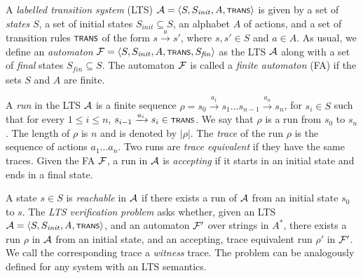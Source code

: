 \begin{definition}
	A \emph{labelled transition system} (LTS) \cite{heussner2012reachability}  $\cal A = \tup{S,S_{\mathit{init}},A,\trans}$ is given by a set of \emph{states} $S$, a set of initial states $S_{\mathit{init}}\subseteq S$, an alphabet $A$ of actions, and a set of transition rules $\scrsf{trans}$ of the form $s \xrightarrow{a} s'$, where $s,s'\in S$ and $a \in A$. As usual, we define an \emph{automaton} $\cal F = \tup{S, S_{\mathit{init}}, A, \trans, S_{\mathit{fin}}}$ as the LTS $\cal A$ along with a set of \emph{final} states $S_{\mathit{fin}} \subseteq S$. The automaton $\cal F$ is called a \emph{finite automaton} (FA) if the sets $S$ and $A$ are finite.
\end{definition}

A \emph{run} in the LTS $\cal A$ is a finite sequence $\rho = s_0 \xrightarrow{a_1} s_1 \ldots s_{n-1} \xrightarrow{a_n} s_n$, for $s_i \in S$ such that for every $1 \leq i \leq n$, $s_{i-1} \xrightarrow{a_i} s_i \in \trans$. We say that $\rho$ is a run from $s_0$ to $s_n$. The length of $\rho$ is $n$ and is denoted by $|\rho|$. The \emph{trace} of the run $\rho$ is the sequence of actions $a_1\ldots a_n$. Two runs are \emph{trace equivalent} if they have the same traces. Given the FA $\cal F$, a run in $\cal A$ is \emph{accepting} if it starts in an initial state and ends in a final state.

A state $s \in S$ is \emph{reachable} in $\cal A$ if there exists a run of $\cal A$ from an initial state $s_0$ to $s$.  The \emph{LTS verification} \emph{problem} asks whether, given an LTS $\cal A = \tup{S,S_{\mathit{init}},A,\trans}$, and an automaton $\cal F'$
over strings in $A^*$, there exists a run $\rho$ in $\cal A$ from an initial state, and an accepting, trace equivalent run $\rho'$ in $\cal F'$. We call the corresponding trace a \emph{witness} trace. The problem can be analogously defined for any system with an LTS semantics.






	









		












